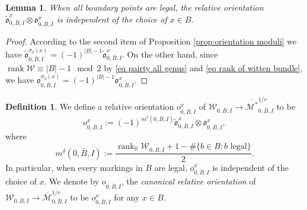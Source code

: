 \documentclass[11pt,a4paper]{article}
\newtheorem{lem}[dummy]{Lemma}
\theoremstyle{definition}
\newtheorem{dfn}[dummy]{Definition}
\theoremstyle{remark}
\numberwithin{equation}{section}
\begin{document}
\begin{lem}\label{lem independent of choice of point g=0}
When all boundary points are legal, the relative orientation $\tilde{\mathfrak o}^{x}_{0,\bar{B},I}\otimes {\mathfrak o}^{x}_{0,\bar{B},I}$ is independent of the choice of $x\in B$.
\end{lem}

\begin{proof}
    According to the second item of Proposition \ref{prop:orientation moduli} we have $\tilde{\mathfrak o}^{\sigma_2(x)}_{0,\bar{B},I}=(-1)^{\vert B \vert-1}\tilde{\mathfrak o}^{x}_{0,\bar{B},I}$.
    On the other hand, since $\operatorname{rank} \mathcal W\equiv \lvert  B\rvert-1 \mod 2$ by \eqref{eq pairty all genus}
     and \eqref{eq rank of witten bundle}, we have ${\mathfrak o}^{\sigma_2(x)}_{0,\bar{B},I}=(-1)^{\vert B \vert-1}{\mathfrak o}^{x}_{0,\bar{B},I}$. 

\end{proof}


\begin{dfn}
    We define a relative orientation ${ o}^{x}_{0,\bar{B},I}$ of  $\mathcal W_{0,\bar{B},I}\to \overline {\mathcal M^*}^{1/r}_{0,\bar{B},I}$ to be \begin{equation}    \label{eq definition canonical orientation}  
    { o}^{x}_{0,\bar{B},I}:=(-1)^{m^\delta(0,\bar{B},I)}\tilde{\mathfrak o}^{x}_{0,\bar{B},I}\otimes {\mathfrak o}^{x}_{0,\bar{B},I},
    \end{equation} 
    where 
    $$m^\delta(0,\bar{B},I):=\frac{\operatorname{rank}_{\mathbb R}\mathcal W_{0,\bar{B},I}+1-\#\{b\in B\colon b \text{ legal}\}}{2}.$$
    In particular, when every markings in $B$ are legal, ${ o}^{x}_{0,\bar{B},I}$ is independent of the choice of $x$. We denote by ${ o}^{}_{0,\bar{B},I}$, the \textit{canonical relative orientation} of $\mathcal W_{0,\bar{B},I}\to \overline {\mathcal M}^{1/r}_{0,\bar{B},I}$ to be ${ o}^{x}_{0,\bar{B},I}$ for any $x\in B$.
\end{dfn}

  
\end{document}
